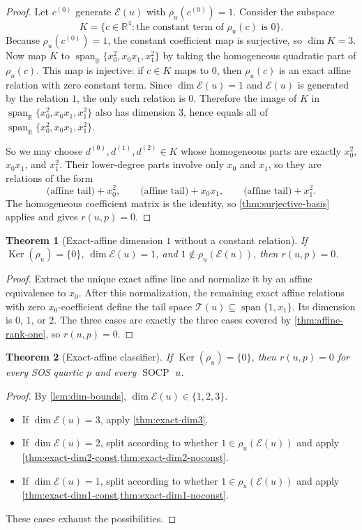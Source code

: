 \documentclass[10pt]{article}
\newtheorem{theorem}{Theorem}[section]
\theoremstyle{definition}
\newcommand{\R}{\mathbb{R}}
\newcommand{\HomQ}{\operatorname{span}_{\R}\{x_0^2,x_0x_1,x_1^2\}}
\DeclareMathOperator{\mspan}{span}
\DeclareMathOperator{\kernel}{Ker}
\newcommand{\Span}{\mspan}
\newcommand{\Ker}{\kernel}
\newcommand{\SOCP}{\operatorname{SOCP}}
\newcommand{\rel}{\rho}
\newcommand{\Exact}{\mathcal{E}}
\newcommand{\Tail}{\mathcal{T}}
\begin{document}
\begin{proof}
Let \(c^{(0)}\) generate \(\Exact(u)\) with \(\rel_u(c^{(0)})=1\). Consider
the subspace
\[
  K=\{c\in \R^4 : \text{the constant term of }\rel_u(c)\text{ is }0\}.
\]
Because \(\rel_u(c^{(0)})=1\), the constant coefficient map is surjective, so
\(\dim K=3\). Now map \(K\) to \(\HomQ\) by taking the homogeneous quadratic
part of \(\rel_u(c)\). This map is injective: if \(c\in K\) maps to \(0\),
then \(\rel_u(c)\) is an exact affine relation with zero constant term. Since
\(\dim \Exact(u)=1\) and \(\Exact(u)\) is generated by the relation \(1\), the
only such relation is \(0\). Therefore the image of \(K\) in \(\HomQ\) also has
dimension \(3\), hence equals all of \(\HomQ\).

So we may choose \(d^{(0)},d^{(1)},d^{(2)}\in K\) whose homogeneous parts are
exactly \(x_0^2\), \(x_0x_1\), and \(x_1^2\). Their lower-degree parts involve
only \(x_0\) and \(x_1\), so they are relations of the form
\[
  \text{(affine tail)}+x_0^2,\qquad
  \text{(affine tail)}+x_0x_1,\qquad
  \text{(affine tail)}+x_1^2.
\]
The homogeneous coefficient matrix is the identity, so
\cref{thm:surjective-basis} applies and gives \(r(u,p)=0\).
\end{proof}

\begin{theorem}[Exact-affine dimension \(1\) without a constant relation]
\label{thm:exact-dim1-noconst}
If \(\Ker(\rel_u)=\{0\}\), \(\dim \Exact(u)=1\), and
\(1\notin \rel_u(\Exact(u))\), then \(r(u,p)=0\).
\end{theorem}

\begin{proof}
Extract the unique exact affine line and normalize it by an affine equivalence
to \(x_0\). After this normalization, the remaining exact affine relations with
zero \(x_0\)-coefficient define the tail space \(\Tail(u)\subseteq\Span\{1,x_1\}\).
Its dimension is \(0\), \(1\), or \(2\). The three cases are exactly the three
cases covered by \cref{thm:affine-rank-one}, so \(r(u,p)=0\).
\end{proof}

\begin{theorem}[Exact-affine classifier]
\label{thm:classifier}
If \(\Ker(\rel_u)=\{0\}\), then \(r(u,p)=0\) for every SOS quartic \(p\) and
every \(\SOCP\) \(u\).
\end{theorem}

\begin{proof}
By \cref{lem:dim-bounds}, \(\dim \Exact(u)\in\{1,2,3\}\).
\begin{itemize}
\item If \(\dim \Exact(u)=3\), apply \cref{thm:exact-dim3}.
\item If \(\dim \Exact(u)=2\), split according to whether \(1\in \rel_u(\Exact(u))\)
and apply \cref{thm:exact-dim2-const,thm:exact-dim2-noconst}.
\item If \(\dim \Exact(u)=1\), split according to whether \(1\in \rel_u(\Exact(u))\)
and apply \cref{thm:exact-dim1-const,thm:exact-dim1-noconst}.
\end{itemize}
These cases exhaust the possibilities.
\end{proof}
\end{document}
